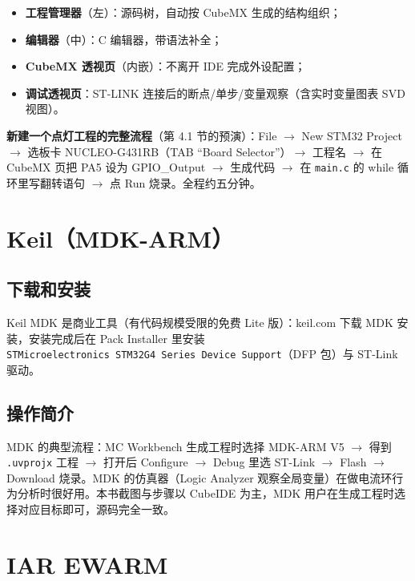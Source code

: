 \documentclass[
  UTF8,
  scheme=plain,
  fontsize=10pt,
  openany
]{ctexbook}
\begin{document}
\begin{itemize}
\tightlist
\item
  \textbf{工程管理器}（左）：源码树，自动按 CubeMX 生成的结构组织；
\item
  \textbf{编辑器}（中）：C 编辑器，带语法补全；
\item
  \textbf{CubeMX 透视页}（内嵌）：不离开 IDE 完成外设配置；
\item
  \textbf{调试透视页}：ST-LINK
  连接后的断点/单步/变量观察（含实时变量图表 SVD 视图）。
\end{itemize}

\textbf{新建一个点灯工程的完整流程}（第 4.1 节的预演）：File
\(\rightarrow\) New STM32 Project \(\rightarrow\) 选板卡
NUCLEO-G431RB（TAB ``Board Selector''）\(\rightarrow\) 工程名
\(\rightarrow\) 在 CubeMX 页把 PA5 设为 GPIO\_Output \(\rightarrow\)
生成代码 \(\rightarrow\) 在 \texttt{main.c} 的 while 循环里写翻转语句
\(\rightarrow\) 点 Run 烧录。全程约五分钟。

\section{Keil（MDK-ARM）}\label{keilmdk-arm}

\subsection{下载和安装}\label{ux4e0bux8f7dux548cux5b89ux88c5-2}

Keil MDK 是商业工具（有代码规模受限的免费 Lite 版）：keil.com 下载 MDK
安装，安装完成后在 Pack Installer 里安装
\texttt{STMicroelectronics\ STM32G4\ Series\ Device\ Support}（DFP
包）与 ST-Link 驱动。

\subsection{操作简介}\label{ux64cdux4f5cux7b80ux4ecb}

MDK 的典型流程：MC Workbench 生成工程时选择 MDK-ARM V5 \(\rightarrow\)
得到 \texttt{.uvprojx} 工程 \(\rightarrow\) 打开后 Configure
\(\rightarrow\) Debug 里选 ST-Link \(\rightarrow\) Flash \(\rightarrow\)
Download 烧录。MDK 的仿真器（Logic Analyzer
观察全局变量）在做电流环行为分析时很好用。本书截图与步骤以 CubeIDE
为主，MDK 用户在生成工程时选择对应目标即可，源码完全一致。

\section{IAR EWARM}\label{iar-ewarm}
\end{document}
